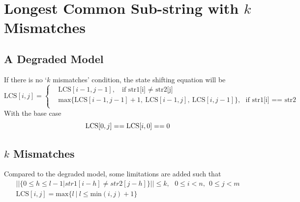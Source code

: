 \documentclass[15pt]{article}
\begin{document}
\section{Longest Common Sub-string with $k$ Mismatches}
\subsection{A Degraded Model}
If there is no `$k$ mismatches' condition, the state shifting equation will be
\begin{equation}
\text{LCS}[i, j] = \left\{
\begin{aligned}
    &\text{LCS}[i-1 ,j-1],~~~\text{if str1[i] $\neq$ str2[j]} \\
    &\text{max}\{\text{LCS}[i-1, j-1] + 1,~ \text{LCS}[i-1,j],~\text{LCS}[i,j-1]\},~~~\text{if str1[i] == str2}\\
\end{aligned}
\right.
\end{equation}
With the base case
\begin{equation}
    \text{LCS}[0, j] == \text{LCS}[i,0] == 0 \notag
\end{equation}
\subsection{$k$ Mismatches}
Compared to the degraded model, some limitations are added such that
\begin{gather}
    \bigg|\bigg|\bigg\{0\leq h\leq l-1\bigg|str1[i-h] \neq str2[j-h]\bigg\}\bigg|\bigg|\leq k,~~~0\leq i<n,~~0\leq j <m \\
    \text{LCS}[i,j] = \text{max}\{l~|~l\leq \text{min}(i,j)+1\}
\end{gather}
\end{document}
